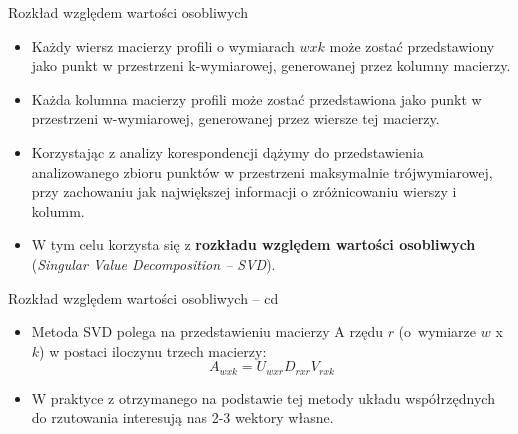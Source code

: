 \documentclass{beamer}
\begin{document}
\begin{frame}{Rozkład względem wartości osobliwych}
  \begin{itemize}
  \item Każdy wiersz macierzy profili o wymiarach $wxk$ może zostać przedstawiony jako punkt w przestrzeni k-wymiarowej, generowanej przez kolumny macierzy.
  \item Każda kolumna macierzy profili może zostać przedstawiona jako punkt w przestrzeni w-wymiarowej, generowanej przez wiersze tej macierzy.
  \item Korzystając z analizy korespondencji dążymy do przedstawienia analizowanego zbioru punktów w przestrzeni maksymalnie trójwymiarowej, przy zachowaniu jak największej informacji o zróżnicowaniu wierszy i kolumm.
  \item W tym celu korzysta się z \textbf{rozkładu względem wartości osobliwych} (\emph{Singular Value Decomposition -- SVD}).
  \end{itemize}
\end{frame}

\begin{frame}{Rozkład względem wartości osobliwych -- cd}
  \begin{itemize}
  \item Metoda SVD polega na przedstawieniu macierzy A rzędu $r$ (o~wymiarze $w$ x $k$) w postaci iloczynu trzech macierzy:
    $$A_{wxk} = U_{wxr} D_{rxr} V_{rxk}$$
    \item W praktyce z otrzymanego na podstawie tej metody układu współrzędnych do rzutowania interesują nas 2-3 wektory własne.
  \end{itemize}
\end{frame}
\end{document}
